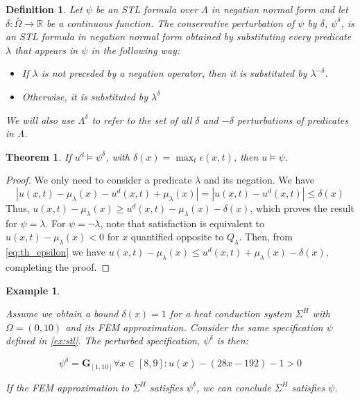 \documentclass[letterpaper, 10 pt, conference]{ieeeconf/ieeeconf}
\newtheorem{theorem}{Theorem}
\newtheorem{definition}{Definition}
\newtheorem{example}{Example}
\newcommand*{\R}{\mathbb{R}}
\newcommand{\Always}{\mathbf{G}}
\begin{document}
\begin{definition}
\label{def:delta_perturbation}
    Let $\psi$ be an STL formula over $\Lambda$ in negation normal form 
    and let $\delta : \bar\Omega \to \R$ be a continuous function. The
    conservative perturbation of $\psi$ by $\delta$, $\psi^\delta$, is an STL
    formula in negation normal form obtained by substituting every predicate
    $\lambda$ that appears in $\psi$ in the following way:

    \begin{itemize}
        \item If $\lambda$ is not preceded by a negation operator, then it is
            substituted by $\lambda^{-\delta}$.
        \item Otherwise, it is substituted by $\lambda^{\delta}$
    \end{itemize}

    We will also use $\Lambda^{\delta}$ to refer to the set of all $\delta$ and
    $-\delta$
    perturbations of predicates in $\Lambda$.
\end{definition}

\begin{theorem}
\label{th:epsilon_approximation}
    If $u^d \models \psi^{\delta}$, with $\delta(x) = \max_t \epsilon(x, t)$, then $u \models \psi$.
\end{theorem}
\begin{proof}
    We only need to consider a predicate $\lambda$ and its negation. We have
    \begin{equation}
        \label{eq:th_epsilon}
         |u(x, t) - \mu_\lambda(x) - u^d(x, t) + \mu_\lambda(x)| = 
         |u(x, t) - u^d(x, t)| \leq \delta(x)
    \end{equation}
    Thus, $u(x, t) - \mu_\lambda(x) \geq u^d(x, t) -
    \mu_\lambda(x) - \delta(x)$, which proves the result for $\psi = \lambda$. For $\psi
    = \lnot \lambda$, note that satisfaction is equivalent to $u(x, t) -
    \mu_\lambda(x) < 0$ for $x$ quantified opposite to $Q_\lambda$. Then, from
    \cref{eq:th_epsilon} we have $u(x, t) - \mu_\lambda(x) \leq u^d(x, t) +
    \mu_\lambda(x) - \delta(x)$, completing the proof.
\end{proof}

\begin{example}
    \label{ex:eps_approx}

    Assume we obtain a bound $\delta(x) = 1$ for a heat conduction system
    $\Sigma^H$ with $\Omega = (0, 10)$ and its
    FEM approximation. Consider the same specification $\psi$ defined in \cref{ex:stl}.
    The perturbed specification, $\psi^\delta$ is then:
    
    \begin{equation}
        \psi^\delta = \Always_{[1,10]} \forall x \in [8,9] : u(x) - (28x -
        192) - 1 > 0
    \end{equation}

    If the FEM approximation to $\Sigma^H$ satisfies $\psi^\delta$, we can
    conclude $\Sigma^H$ satisfies $\psi$.
    
\end{example}
\end{document}
